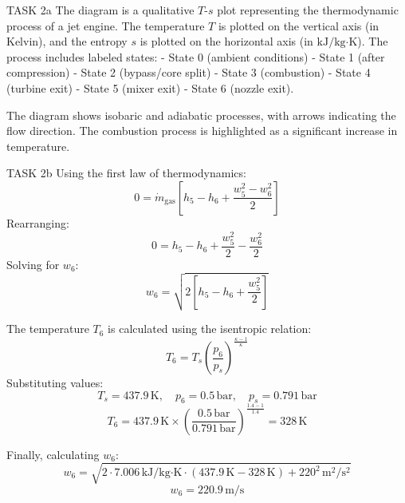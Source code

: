 TASK 2a  
The diagram is a qualitative \( T \)-\( s \) plot representing the thermodynamic process of a jet engine. The temperature \( T \) is plotted on the vertical axis (in Kelvin), and the entropy \( s \) is plotted on the horizontal axis (in \( \text{kJ}/\text{kg·K} \)). The process includes labeled states:  
- State 0 (ambient conditions)  
- State 1 (after compression)  
- State 2 (bypass/core split)  
- State 3 (combustion)  
- State 4 (turbine exit)  
- State 5 (mixer exit)  
- State 6 (nozzle exit).  

The diagram shows isobaric and adiabatic processes, with arrows indicating the flow direction. The combustion process is highlighted as a significant increase in temperature.  

TASK 2b  
Using the first law of thermodynamics:  
\[
0 = \dot{m}_{\text{gas}} \left[ h_5 - h_6 + \frac{w_5^2 - w_6^2}{2} \right]
\]  
Rearranging:  
\[
0 = h_5 - h_6 + \frac{w_5^2}{2} - \frac{w_6^2}{2}
\]  
Solving for \( w_6 \):  
\[
w_6 = \sqrt{2 \left[ h_5 - h_6 + \frac{w_5^2}{2} \right]}
\]  

The temperature \( T_6 \) is calculated using the isentropic relation:  
\[
T_6 = T_s \left( \frac{p_6}{p_s} \right)^{\frac{\kappa - 1}{\kappa}}
\]  
Substituting values:  
\[
T_s = 437.9 \, \text{K}, \quad p_6 = 0.5 \, \text{bar}, \quad p_s = 0.791 \, \text{bar}
\]  
\[
T_6 = 437.9 \, \text{K} \times \left( \frac{0.5 \, \text{bar}}{0.791 \, \text{bar}} \right)^{\frac{1.4 - 1}{1.4}} = 328 \, \text{K}
\]  

Finally, calculating \( w_6 \):  
\[
w_6 = \sqrt{2 \cdot 7.006 \, \text{kJ}/\text{kg·K} \cdot (437.9 \, \text{K} - 328 \, \text{K}) + 220^2 \, \text{m}^2/\text{s}^2}
\]  
\[
w_6 = 220.9 \, \text{m/s}
\]